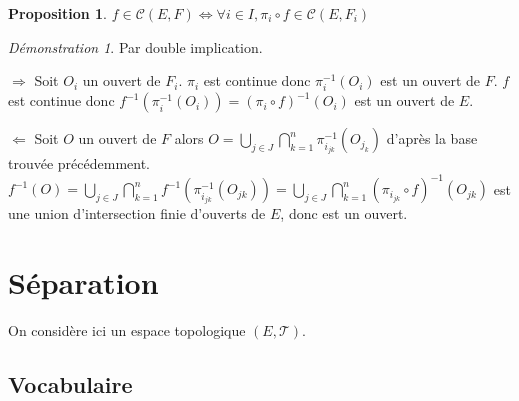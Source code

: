 \documentclass[a4paper, 11pt, french]{book}
\newenvironment{itemise}{\itemize}{\enditemize}
\theoremstyle{plain} %
\newtheorem{proposition}{Proposition}
\theoremstyle{definition} %
\theoremstyle{remark} %
\newtheorem*{demonstration}{Démonstration}
\newcommand{\1}{\mathds{1}}
\newcommand{\cont}{\mathcal{C}}
\newcommand{\inv}[1]{#1^{-1}}
\begin{document}
\begin{proposition}
	$f\in\cont(E, F)\iff\forall i\in I, \pi_i\circ f\in\cont(E, F_i)$
\end{proposition}

\begin{demonstration}
	Par double implication.
	\begin{itemise}
		\item[$\Rightarrow$] Soit $O_i$ un ouvert de $F_i$.
		$\pi_i$ est continue donc $\inv{\pi_i}(O_i)$ est un ouvert de $F$.
		$f$ est continue donc $\inv{f}(\inv{\pi_i}(O_i))=\inv{(\pi_i\circ f)}(O_i)$ est un ouvert de $E$.
		\item[$\Leftarrow$] Soit $O$ un ouvert de $F$ alors $O=\bigcup_{j\in J}\bigcap_{k=1}^n\inv{\pi_{i_{jk}}}(O_{j_k})$ d'après la base trouvée précédemment.
		$\inv{f}(O)=\bigcup_{j\in J}\bigcap_{k=1}^n\inv{f}(\inv{\pi_{i_{jk}}}(O_{jk}))=\bigcup_{j\in J}\bigcap_{k=1}^n\inv{(\pi_{i_{jk}}\circ f)}(O_{jk})$ est une union d'intersection finie d'ouverts de $E$, donc est un ouvert.
	\end{itemise}
\end{demonstration}

\chapter{Séparation}

On considère ici un espace topologique $(E, \mathscr{T})$.

\section{Vocabulaire}
\end{document}
